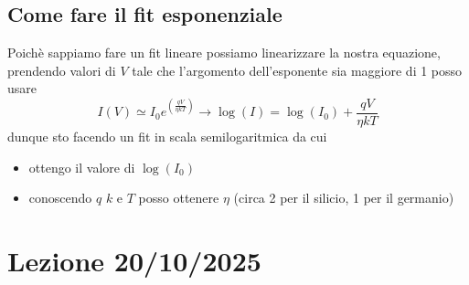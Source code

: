 \documentclass{article}
\begin{document}
\subsection{Come fare il fit esponenziale}
Poichè sappiamo fare un fit lineare possiamo linearizzare la nostra equazione, prendendo valori di $V$ tale che l'argomento dell'esponente sia maggiore di 1 posso usare
 \[
 I(V) \simeq I_0 e^{(\frac{qV}{\eta kT})} \rightarrow \log(I) = \log(I_0) + \frac{qV}{\eta kT}
 \]
 dunque sto facendo un fit in scala semilogaritmica da cui
 \begin{itemize}
  \item ottengo il valore di $\log(I_0)$ 
  \item conoscendo $q$ $ k$ e $T$ posso ottenere $\eta$ (circa 2 per il silicio, 1 per il germanio)
 \end{itemize}

\section{Lezione 20/10/2025}
\end{document}
